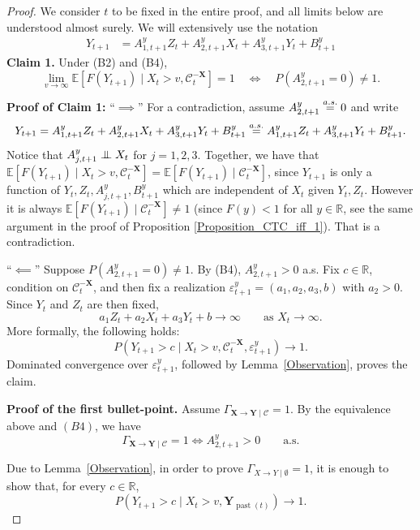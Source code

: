 \documentclass[a4paper,11pt]{article}
\newcommand{\indep}{\perp\kern-5.5pt\perp}
\newcommand{\toverset}[2]{\overset{{\rm #1}}{#2}}
\DeclareMathOperator{\past}{past}
\begin{document}
\begin{proof}
We consider $t$ to be fixed in the entire proof, and all limits below are understood almost surely. We will extensively use the notation 
\begin{equation*}
    \begin{split}
Y_{t+1}&=A_{1,t+1}^yZ_t + A_{2,t+1}^yX_t + A_{3,t+1}^yY_t+B_{t+1}^y 
    \end{split}
\end{equation*}
\textbf{Claim 1.} Under (B2) and (B4),
\[
\lim_{v\to\infty}
\mathbb E\!\left[
F(Y_{t+1})\mid X_t>v,\mathcal C_t^{-\mathbf X}
\right]=1
\quad\Longleftrightarrow\quad
P(A^y_{2,t+1}=0)\neq 1 .
\]

\textbf{Proof of Claim 1: } ``$\implies$'' For a contradiction, assume  $A_{2,t+1}^y\toverset{a.s.}{=}0$ and write 
\begin{equation}\label{eq97}
  Y_{t+1}=A_{1,t+1}^yZ_t + A_{2,t+1}^yX_t + A_{3,t+1}^yY_t+B_{t+1}^y\toverset{a.s.}{=}A_{1,t+1}^yZ_t + A_{3,t+1}^yY_t+B_{t+1}^y.   
\end{equation}
Notice that $A^y_{j,t+1}\indep X_t$ for $j=1,2,3$.  Together, we have that $\mathbb{E}[ F(Y_{t+1})\mid X_t>v,\mathcal{C}^{-\textbf{X}}_t]= \mathbb{E}[ F(Y_{t+1})\mid \mathcal{C}^{-\textbf{X}}_t]$, since $Y_{t+1}$ is only a function of $Y_t, Z_t, A^y_{j,t+1}, B^y_{t+1}$ which are independent of $X_t$ given $Y_t, Z_t$. However it is always $ \mathbb{E}[ F(Y_{t+1})\mid \mathcal{C}^{-\textbf{X}}_t]\neq 1$ (since $F(y)<1$ for all $y\in\mathbb{R}$, see the same argument in the proof of Proposition \ref{Proposition_CTC_iff_1}).  That is a contradiction.

``$\impliedby$'' Suppose \(P(A^y_{2,t+1}=0)\neq1\). By (B4), \(A^y_{2,t+1}>0\) a.s. Fix \(c\in\mathbb R\), condition on
\(\mathcal C_t^{-\mathbf X}\), and then fix a realization \(\varepsilon^y_{t+1}=(a_1,a_2,a_3,b)\) with \(a_2>0\). Since \(Y_t\) and \(Z_t\) are then fixed,
\[
a_1Z_t+a_2X_t+a_3Y_t+b \to \infty
\qquad \text{as } X_t\to\infty .
\]
More formally, the following holds:
\[
P(Y_{t+1}>c
\mid X_t>v,\mathcal C_t^{-\mathbf X},\varepsilon^y_{t+1})
\to 1 .
\]
Dominated convergence over \(\varepsilon^y_{t+1}\), followed by Lemma~\ref{Observation}, proves the claim.

\textbf{Proof of the first bullet-point. }
Assume \(\Gamma_{\mathbf X\to\mathbf Y\mid\mathcal C}=1\). By the equivalence above and \((B4)\), we have
\[
  \Gamma_{\mathbf X\to\mathbf Y\mid\mathcal C}=1 \iff    A^y_{2,t+1}>0
    \qquad\text{a.s.}
\]

Due to Lemma~\ref{Observation}, in order to prove \(
    \Gamma_{X\to Y\mid \emptyset}=1
\), it is enough to show that, for every \(c\in\mathbb R\),
\begin{equation}
    \label{eq432}
    P(Y_{t+1}>c\mid X_t>v,\mathbf Y_{\past(t)})\to 1 .
\end{equation}



\end{proof}
\end{document}
